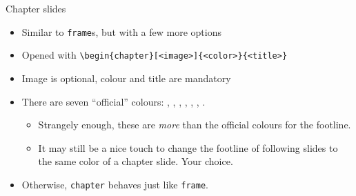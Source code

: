 \begin{frame}[fragile]{Chapter slides}
	\begin{itemize}
		\item Similar to \verb|frame|s, but with a few more options
		\item Opened with \verb|\begin{chapter}[<image>]{<color>}{<title>}|
		\item Image is optional, colour and title are mandatory
		\item There are seven ``official'' colours: ,
		      , ,
		      , , ,
		      .
		      \begin{itemize}
			      \item Strangely enough, these are \emph{more} than the official colours
			            for the footline.
			      \item It may still be a nice touch to change the footline of following
			            slides to the same color of a chapter slide. Your choice.
		      \end{itemize}
		\item Otherwise, \verb|chapter| behaves just like \verb|frame|.
	\end{itemize}
\end{frame}
